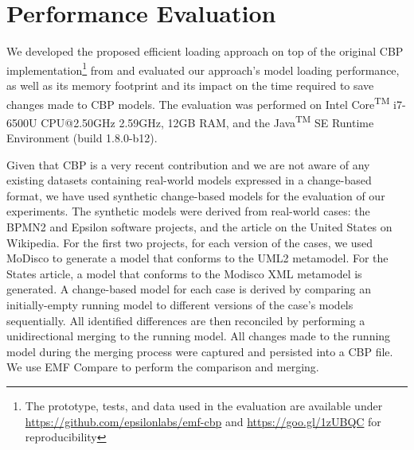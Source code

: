 \documentclass{llncs}
\begin{document}
    \section{Performance Evaluation}
    \label{sec:performance_evaluation}
    
    We developed the proposed efficient loading approach on top of the original CBP implementation\footnote{The prototype, tests, and data used in the evaluation are available under \url{https://github.com/epsilonlabs/emf-cbp} and \url{https://goo.gl/1zUBQC} for reproducibility} from \cite{yohannis2017turning} and evaluated our approach's model loading performance, as well as its memory footprint and its impact on the time required to save changes made to CBP models. The evaluation was performed on Intel\textsuperscript{\textregistered} Core\textsuperscript{TM} i7-6500U CPU@2.50GHz 2.59GHz, 12GB RAM, and the Java\textsuperscript{TM} SE Runtime Environment (build 1.8.0-b12).
    
    Given that CBP is a very recent contribution and we are not aware of any existing datasets containing real-world models expressed in a change-based format, we have used synthetic change-based models for the evaluation of our experiments. The synthetic models were derived from real-world cases: the BPMN2 \cite{eclipse2017bpmn2,eclipse2018bpmn2git} and Epsilon \cite{eclipse2017epsilon,eclipse2018epsilongit} software projects, and the article on the United States \cite{wikipedia2018us} on Wikipedia. For the first two projects, for each version of the cases, we used MoDisco \cite{DBLP:journals/infsof/BruneliereCDM14} to generate a model that conforms to the UML2 \cite{eclipse2017uml2} metamodel.  For the States article, a model that conforms to the Modisco XML metamodel \cite{eclipse2018modiscoxml} is generated. A change-based model for each case is derived by comparing an initially-empty running model to different versions of the case's models sequentially. All identified differences are then reconciled by performing a unidirectional merging to the running model. All changes made to the running model during the merging process were captured and persisted into a CBP file. We use EMF Compare \cite{eclipse2017compare} to perform the comparison and merging.
    
\end{document}
